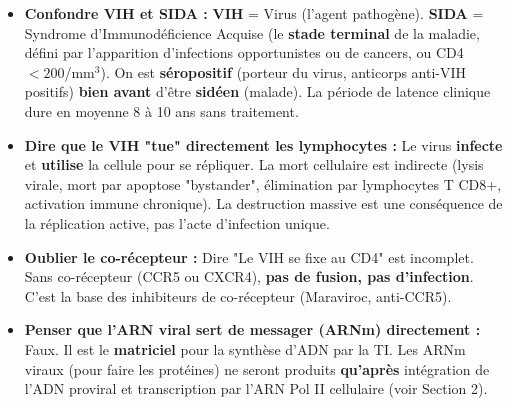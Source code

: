 \documentclass[11pt]{article}
\begin{document}
\begin{attention}
\begin{itemize}
    \item \textbf{Confondre VIH et SIDA :} \textbf{VIH} = Virus (l'agent pathogène). \textbf{SIDA} = Syndrome d'Immunodéficience Acquise (le \textbf{stade terminal} de la maladie, défini par l'apparition d'infections opportunistes ou de cancers, ou CD4 $< 200$/mm$^3$). On est \textbf{séropositif} (porteur du virus, anticorps anti-VIH positifs) \textbf{bien avant} d'être \textbf{sidéen} (malade). La période de latence clinique dure en moyenne 8 à 10 ans sans traitement.
    \item \textbf{Dire que le VIH "tue" directement les lymphocytes :} Le virus \textbf{infecte} et \textbf{utilise} la cellule pour se répliquer. La mort cellulaire est indirecte (lysis virale, mort par apoptose "bystander", élimination par lymphocytes T CD8+, activation immune chronique). La destruction massive est une conséquence de la réplication active, pas l'acte d'infection unique.
    \item \textbf{Oublier le co-récepteur :} Dire "Le VIH se fixe au CD4" est incomplet. Sans co-récepteur (CCR5 ou CXCR4), \textbf{pas de fusion, pas d'infection}. C'est la base des inhibiteurs de co-récepteur (Maraviroc, anti-CCR5).
    \item \textbf{Penser que l'ARN viral sert de messager (ARNm) directement :} Faux. Il est le \textbf{matriciel} pour la synthèse d'ADN par la TI. Les ARNm viraux (pour faire les protéines) ne seront produits \textbf{qu'après} intégration de l'ADN proviral et transcription par l'ARN Pol II cellulaire (voir Section 2).
\end{itemize}
\end{attention}
\end{document}
